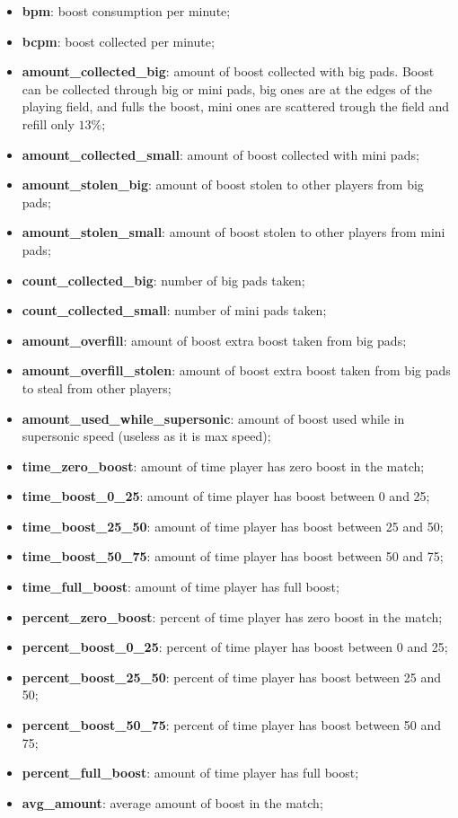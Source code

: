 \begin{itemize}
    \item \textbf{bpm}: boost consumption per minute;
    \item \textbf{bcpm}: boost collected per minute;
    \item \textbf{amount\_collected\_big}: amount of boost collected with big pads. Boost can be collected through big or mini pads, big ones are at the edges of the playing field, and fulls the boost, mini ones are scattered trough the field and refill only $13 \%$;
    \item \textbf{amount\_collected\_small}: amount of boost collected with mini pads;
    \item \textbf{amount\_stolen\_big}: amount of boost stolen to other players from big pads;
    \item \textbf{amount\_stolen\_small}: amount of boost stolen to other players from mini pads;
    \item \textbf{count\_collected\_big}: number of big pads taken;
    \item \textbf{count\_collected\_small}: number of mini pads taken;
    \item \textbf{amount\_overfill}: amount of boost extra boost taken from big pads;
    \item \textbf{amount\_overfill\_stolen}: amount of boost extra boost taken from big pads to steal from other players;
    \item \textbf{amount\_used\_while\_supersonic}: amount of boost used while in supersonic speed (useless as it is max speed);
    \item \textbf{time\_zero\_boost}: amount of time player has zero boost in the match;
    \item \textbf{time\_boost\_0\_25}: amount of time player has boost between 0 and 25;
    \item \textbf{time\_boost\_25\_50}: amount of time player has boost between 25 and 50;
    \item \textbf{time\_boost\_50\_75}: amount of time player has boost between 50 and 75;
    \item \textbf{time\_full\_boost}: amount of time player has full boost;
    \item \textbf{percent\_zero\_boost}: percent of time player has zero boost in the match;
    \item \textbf{percent\_boost\_0\_25}: percent of time player has boost between 0 and 25;
    \item \textbf{percent\_boost\_25\_50}: percent of time player has boost between 25 and 50;
    \item \textbf{percent\_boost\_50\_75}: percent of time player has boost between 50 and 75;
    \item \textbf{percent\_full\_boost}: amount of time player has full boost;
    \item \textbf{avg\_amount}: average amount of boost in the match;
\end{itemize}
